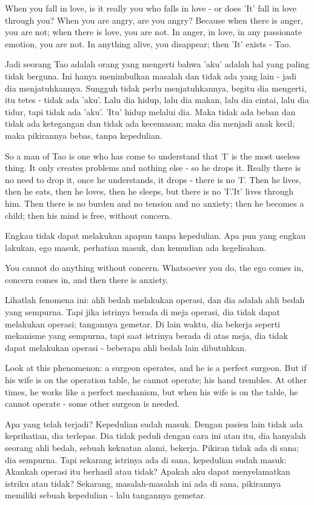 \english
When you fall in love, is it really you who falls in love - or does 'It' fall in love through you? When you are angry, are you angry? Because when there is anger, you are not; when there is love, you are not. In anger, in love, in any passionate emotion, you are not. In anything alive, you disappear; then 'It' exists - Tao.

\bahasa
Jadi seorang Tao adalah orang yang mengerti bahwa 'aku' adalah hal yang paling tidak berguna. Ini hanya menimbulkan masalah dan tidak ada yang lain - jadi dia menjatuhkannya. Sungguh tidak perlu menjatuhkannya, begitu dia mengerti, itu tetes - tidak ada 'aku'. Lalu dia hidup, lalu dia makan, lalu dia cintai, lalu dia tidur, tapi tidak ada 'aku'. 'Itu' hidup melalui dia. Maka tidak ada beban dan tidak ada ketegangan dan tidak ada kecemasan; maka dia menjadi anak kecil; maka pikirannya bebas, tanpa kepedulian.

\english
So a man of Tao is one who has come to understand that 'I' is the most useless thing. It only creates problems and nothing else - so he drops it. Really there is no need to drop it, once he understands, it drops - there is no 'I'. Then he lives, then he eats, then he loves, then he sleeps, but there is no 'I'.'It' lives through him. Then there is no burden and no tension and no anxiety; then he becomes a child; then his mind is free, without concern.

\bahasa
Engkau tidak dapat melakukan apapun tanpa kepedulian. Apa pun yang engkau lakukan, ego masuk, perhatian masuk, dan kemudian ada kegelisahan.

\english
You cannot do anything without concern. Whatsoever you do, the ego comes in, concern comes in, and then there is anxiety.

\bahasa
Lihatlah fenomena ini: ahli bedah melakukan operasi, dan dia adalah ahli bedah yang sempurna. Tapi jika istrinya berada di meja operasi, dia tidak dapat melakukan operasi; tangannya gemetar. Di lain waktu, dia bekerja seperti mekanisme yang sempurna, tapi saat istrinya berada di atas meja, dia tidak dapat melakukan operasi - beberapa ahli bedah lain dibutuhkan.

\english
Look at this phenomenon: a surgeon operates, and he is a perfect surgeon. But if his wife is on the operation table, he cannot operate; his hand trembles. At other times, he works like a perfect mechanism, but when his wife is on the table, he cannot operate - some other surgeon is needed.

\bahasa
Apa yang telah terjadi? Kepedulian sudah masuk. Dengan pasien lain tidak ada keprihatian, dia terlepas. Dia tidak peduli dengan cara ini atau itu, dia hanyalah seorang ahli bedah, sebuah kekuatan alami, bekerja. Pikiran tidak ada di sana; dia sempurna. Tapi sekarang istrinya ada di sana, kepedulian sudah masuk: Akankah operasi itu berhasil atau tidak? Apakah aku dapat menyelamatkan istriku atau tidak? Sekarang, masalah-masalah ini ada di sana, pikirannya memiliki sebuah kepedulian - lalu tangannya gemetar.

